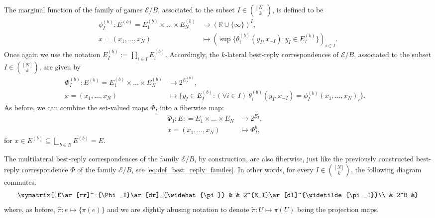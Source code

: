 \documentclass[a4paper,11pt,reqno,english]{amsart}
\theoremstyle{plain}
\theoremstyle{definition}
\newcommand{\Ecal}{\mathcal{E}}
\begin{document}
\medskip
The marginal function of the family of games $\Ecal/B$, associated to the subset $I\in\binom{[N]}{k}$, is defined to be
\begin{align*}
	\phi_I^{(b)}\colon E^{(b)} = E_1^{(b)}\times\dots\times E_N^{(b)} & \longrightarrow (\mathbb{R}\cup\{\infty\})^I  ,                               \\
	x = (x_1,\dots,x_N)                                               & \longmapsto (\sup\{\theta_i^{(b)}(y_I,x_{-I}) : y_I\in E_I^{(b)}\})_{i\in I}.
\end{align*}
Once again we use the notation $E_I^{(b)}:=\prod_{i\in I}E_i^{(b)}$.
Accordingly, the $k$-lateral best-reply correspondences of $\Ecal/B$, associated to the subset $I\in\binom{[N]}{k}$, are given by
\begin{align*}
	\Phi_I^{(b)}\colon E^{(b)} =  E_1^{(b)}\times\dots\times E_N^{(b)} & \longrightarrow 2^{E_I^{(b)}} ,                                                                                            & \\
	x = (x_1,\dots,x_N)                                                & \longmapsto \big\{y_I\in E_I^{(b)} : (\forall i\in I) \ \theta_i^{(b)}(y_I, x_{-I}) = \phi_I^{(b)}(x_1,\dots,x_N)_i\big\}. &
\end{align*}
As before, we can combine the set-valued maps $\Phi_I$ into a fiberwise map:
\begin{align*}
	\Phi_I\colon E: =  E_1\times\dots\times E_N & \longrightarrow 2^{E_I} , & \\
	x = (x_1,\dots,x_N)                         & \longmapsto \Phi_I^b,
\end{align*}
for $x\in E^{(b)}\subseteq \bigsqcup_{b\in B} E^{(b)} = E$.


\medskip
The multilateral best-reply correspondences of the family $\Ecal/B$, by construction, are also fiberwise, just like the previously constructed best-reply correspondence $\Phi$ of the family $\Ecal/B$, see \eqref{eq:def_best_reply_familes}.
In other words, for every $I\in\binom{[N]}{k}$, the following diagram commutes.
\begin{displaymath}
	\xymatrix{
	E\ar[rr]^-{\Phi_I}\ar[dr]_{\widehat{\pi}} & & 2^{E_I}\ar[dl]^{\widetilde{\pi_I}}\\
	& 2^B &}
\end{displaymath}
where, as before, $\widehat{\pi}\colon e\longmapsto\{\pi(e)\}$ and we are slightly abusing notation to denote  $\widetilde{\pi}\colon U\longmapsto \pi(U)$ being the projection maps.
\end{document}
